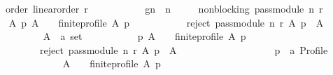 \begin{isabellebody}
\ \ \ order{\isacharcolon}{\kern0pt}\ {\isachardoublequoteopen}linear{\isacharunderscore}{\kern0pt}order\ r{\isachardoublequoteclose}\ \isanewline
\ \ \ \ \ \ \ \ \ \ g{}{\isacharunderscore}{\kern0pt}n{\isacharcolon}{\kern0pt}\ \ {\isachardoublequoteopen}n\ {\isachargreater}{\kern0pt}\ {}{\isachardoublequoteclose}\isanewline
\ \ \ {\isachardoublequoteopen}non{\isacharunderscore}{\kern0pt}blocking\ {\isacharparenleft}{\kern0pt}pass{\isacharunderscore}{\kern0pt}module\ n\ r{\isacharparenright}{\kern0pt}{\isachardoublequoteclose}\isanewline
%
\isadelimproof
%
\endisadelimproof
%
\isatagproof
{}\isamarkupfalse%
\ {\isacharminus}{\kern0pt}\isanewline
\ \ \isamarkupfalse%
\ {\isachardoublequoteopen}{\isasymforall}A\ p{\isachardot}{\kern0pt}\ {\isacharparenleft}{\kern0pt}A\ {\isasymnoteq}\ {\isacharbraceleft}{\kern0pt}{\isacharbraceright}{\kern0pt}\ {\isasymand}\ finite{\isacharunderscore}{\kern0pt}profile\ A\ p{\isacharparenright}{\kern0pt}\ {\isasymlongrightarrow}\isanewline
\ \ \ \ \ \ \ \ \ \ reject\ {\isacharparenleft}{\kern0pt}pass{\isacharunderscore}{\kern0pt}module\ n\ r{\isacharparenright}{\kern0pt}\ A\ p\ {\isasymnoteq}\ A{\isachardoublequoteclose}\isanewline
\ \ \isamarkupfalse%
\isanewline
\ \ \ \ \isamarkupfalse%
\isanewline
\ \ \ \ \ \ A\ {\isacharcolon}{\kern0pt}{\isacharcolon}{\kern0pt}\ {\isachardoublequoteopen}{\isacharprime}{\kern0pt}a\ set{\isachardoublequoteclose}\isanewline
\ \ \ \ \isamarkupfalse%
\isanewline
\ \ \ \ \ \ {\isachardoublequoteopen}{\isasymforall}p{\isachardot}{\kern0pt}\ {\isacharparenleft}{\kern0pt}A\ {\isasymnoteq}\ {\isacharbraceleft}{\kern0pt}{\isacharbraceright}{\kern0pt}\ {\isasymand}\ finite{\isacharunderscore}{\kern0pt}profile\ A\ p{\isacharparenright}{\kern0pt}\ {\isasymlongrightarrow}\isanewline
\ \ \ \ \ \ \ \ \ \ reject\ {\isacharparenleft}{\kern0pt}pass{\isacharunderscore}{\kern0pt}module\ n\ r{\isacharparenright}{\kern0pt}\ A\ p\ {\isasymnoteq}\ A{\isachardoublequoteclose}\isanewline
\ \ \ \ \isamarkupfalse%
\isanewline
\ \ \ \ \ \ \isamarkupfalse%
\isanewline
\ \ \ \ \ \ \ \ p\ {\isacharcolon}{\kern0pt}{\isacharcolon}{\kern0pt}\ {\isachardoublequoteopen}{\isacharprime}{\kern0pt}a\ Profile{\isachardoublequoteclose}\isanewline
\ \ \ \ \ \ \isamarkupfalse%
\isanewline
\ \ \ \ \ \ \ \ {\isachardoublequoteopen}{\isacharparenleft}{\kern0pt}A\ {\isasymnoteq}\ {\isacharbraceleft}{\kern0pt}{\isacharbraceright}{\kern0pt}\ {\isasymand}\ finite{\isacharunderscore}{\kern0pt}profile\ A\ p{\isacharparenright}{\kern0pt}\ {\isasymlongrightarrow}\isanewline

\end{isabellebody}
